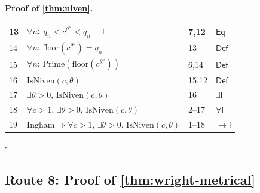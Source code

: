 \documentclass[11pt,reqno]{amsart}
\theoremstyle{blueplain}
\renewcommand{\qedsymbol}{\textcolor{proofqed}{\ensuremath{\square}}}
\renewenvironment{proof}[1][Proof]{\par\noindent\textbf{\textcolor{proofhead}{#1.}}\par\nobreak}{\par\nobreak\hfill\qedsymbol}
\numberwithin{equation}{section}
\begin{document}
\begin{proof}[\textbf{Proof of \cref{thm:niven}}]
{\begin{tabular}{|m{0.7cm}|m{12cm}|m{1.4cm}|m{2.5cm}|}
			13 & $\forall n$: $q_n<c^{\theta^{n}}<q_n+1$ & 7,12 & $\mathsf{Eq}$ \\ \hline
			14 & $\forall n$: $\mathrm{floor}(c^{\theta^{n}})=q_n$ & 13 & $\mathsf{Def}$ \\ \hline
			15 & $\forall n$: $\mathrm{Prime}(\mathrm{floor}(c^{\theta^{n}}))$ & 6,14 & $\mathsf{Def}$ \\ \hline
			16 & $\mathrm{IsNiven}(c,\theta)$ & 15,12 & $\mathsf{Def}$ \\ \hline
			17 & $\exists\theta>0$, $\mathrm{IsNiven}(c,\theta)$ & 16 & $\exists\mathsf{I}$ \\ \hline
			18 & $\forall c>1$, $\exists\theta>0$, $\mathrm{IsNiven}(c,\theta)$ & 2--17 & $\forall\mathsf{I}$ \\ \hline
			19 & $\text{Ingham}\Rightarrow\forall c>1$, $\exists\theta>0$, $\mathrm{IsNiven}(c,\theta)$ & 1--18 & $\rightarrow\mathsf{I}$ \\ \hline
		\end{tabular}
	}
\end{proof}

\subsection{Route 8: Proof of \cref{thm:wright-metrical}}
\end{document}
